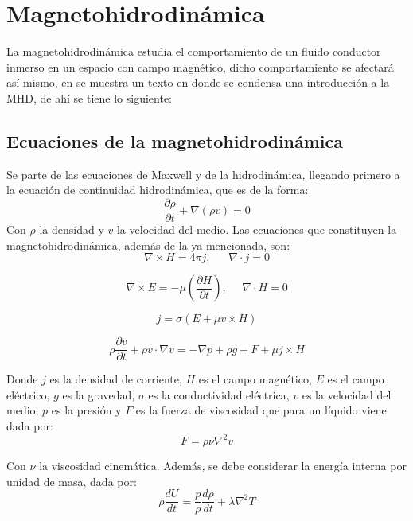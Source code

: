 \section{Magnetohidrodinámica} %
La magnetohidrodinámica estudia el comportamiento de un fluido conductor inmerso en un espacio con campo magnético, dicho comportamiento se afectará así mismo, en \textcite[e.g.,][]{cowling-1976} se muestra un texto en donde se condensa una introducción a la MHD, de ahí se tiene lo siguiente:

\subsection{Ecuaciones de la magnetohidrodinámica}

Se parte de las ecuaciones de Maxwell y de la hidrodinámica, llegando primero a la ecuación de continuidad hidrodinámica, que es de la forma:
\begin{equation}
\frac{\partial \rho}{\partial t}+\nabla(\rho v)=0
\end{equation}
Con $\rho$ la densidad y $v$ la velocidad del medio.
Las ecuaciones que constituyen la magnetohidrodinámica, además de la ya mencionada, son:
\begin{equation}
\nabla \times H=4\pi j,   ~~~~~~~\nabla \cdot j=0
\end{equation}


\begin{equation}
\nabla \times E=-\mu(\frac{\partial H}{\partial t}),~~~~~~\nabla \cdot H=0
\end{equation}

\begin{equation}
j=\sigma(E+\mu v\times H)
\end{equation}

\begin{equation}
\rho\frac{\partial v}{\partial t}+\rho v\cdot \nabla v=-\nabla p+\rho g+F+\mu j\times H
\end{equation}

Donde $j$ es la densidad de corriente, $H$ es el campo magnético, $E$ es el campo eléctrico, $g$ es la gravedad, $\sigma$ es la conductividad eléctrica, $v$ es la velocidad del medio, $p$ es la presión y $F$ es la fuerza de viscosidad que para un líquido viene dada por:
\begin{equation}
F=\rho \nu \nabla^{2}v
\end{equation}

Con $\nu$ la viscosidad cinemática.
Además, se debe considerar la energía interna por unidad de masa, dada por:
\begin{equation}
\rho\frac{dU}{dt}=\frac{p}{\rho}\frac{d\rho}{dt}+\lambda \nabla ^{2}T
\end{equation}

